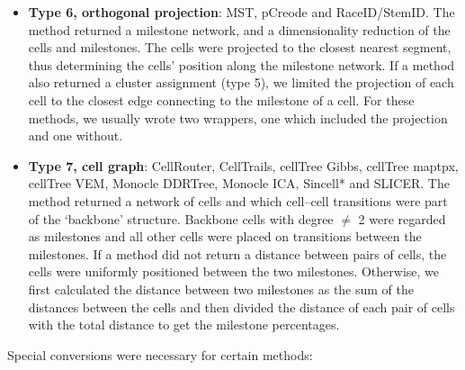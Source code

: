 \begin{itemize}
	\item \textbf{Type 6, orthogonal projection}: MST, pCreode and RaceID/StemID. The method returned a milestone network, and a dimensionality reduction of the cells and milestones. The cells were projected to the closest nearest segment, thus determining the cells’ position along the milestone network. If a method also returned a cluster assignment (type 5), we limited the projection of each cell to the closest edge connecting to the milestone of a cell. For these methods, we usually wrote two wrappers, one which included the projection and one without.
	\item\textbf{ Type 7, cell graph}: CellRouter, CellTrails, cellTree Gibbs, cellTree maptpx, cellTree VEM, Monocle DDRTree, Monocle ICA, Sincell* and SLICER. The method returned a network of cells and which cell–cell transitions were part of the ‘backbone’ structure. Backbone cells with degree $\neq$ 2 were regarded as milestones and all other cells were placed on transitions between the milestones. If a method did not return a distance between pairs of cells, the cells were uniformly positioned between the two milestones. Otherwise, we first calculated the distance between two milestones as the sum of the distances between the cells and then divided the distance of each pair of cells with the total distance to get the milestone percentages.
\end{itemize}


Special conversions were necessary for certain methods:


